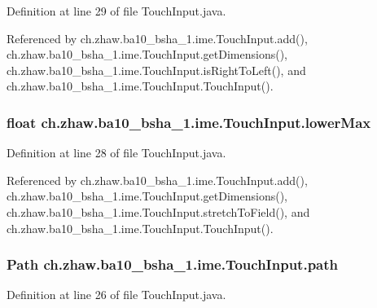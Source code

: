 Definition at line 29 of file TouchInput.java.

Referenced by ch.zhaw.ba10\_\-bsha\_\-1.ime.TouchInput.add(), ch.zhaw.ba10\_\-bsha\_\-1.ime.TouchInput.getDimensions(), ch.zhaw.ba10\_\-bsha\_\-1.ime.TouchInput.isRightToLeft(), and ch.zhaw.ba10\_\-bsha\_\-1.ime.TouchInput.TouchInput().\hypertarget{classch_1_1zhaw_1_1ba10__bsha__1_1_1ime_1_1TouchInput_aaab22f154cdbb07626714d84b808a68a}{
\subsubsection[{lowerMax}]{\setlength{\rightskip}{0pt plus 5cm}float {\bf ch.zhaw.ba10\_\-bsha\_\-1.ime.TouchInput.lowerMax}}}
\label{classch_1_1zhaw_1_1ba10__bsha__1_1_1ime_1_1TouchInput_aaab22f154cdbb07626714d84b808a68a}


Definition at line 28 of file TouchInput.java.

Referenced by ch.zhaw.ba10\_\-bsha\_\-1.ime.TouchInput.add(), ch.zhaw.ba10\_\-bsha\_\-1.ime.TouchInput.getDimensions(), ch.zhaw.ba10\_\-bsha\_\-1.ime.TouchInput.stretchToField(), and ch.zhaw.ba10\_\-bsha\_\-1.ime.TouchInput.TouchInput().\hypertarget{classch_1_1zhaw_1_1ba10__bsha__1_1_1ime_1_1TouchInput_ae40ac5199f39cda2322b9b74b4f388aa}{
\subsubsection[{path}]{\setlength{\rightskip}{0pt plus 5cm}Path {\bf ch.zhaw.ba10\_\-bsha\_\-1.ime.TouchInput.path}}}
\label{classch_1_1zhaw_1_1ba10__bsha__1_1_1ime_1_1TouchInput_ae40ac5199f39cda2322b9b74b4f388aa}


Definition at line 26 of file TouchInput.java.

